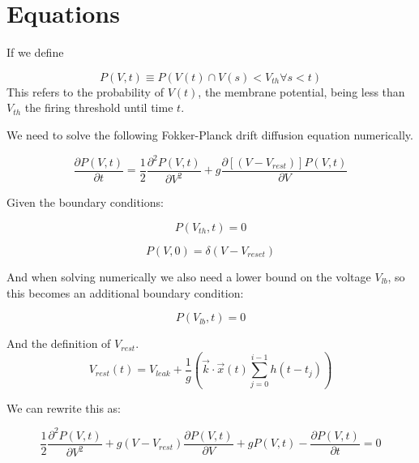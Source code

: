 \documentclass[10pt]{article}
\begin{document}
 

\section{Equations}


If we define

\begin{equation}
    P(V,t) \equiv P(V(t) \cap  V(s) < V_{th} \forall s < t)
\end{equation}
This refers to the probability of $V(t)$, the membrane potential,
being less than $V_{th}$ the firing threshold until time $t$.  


We need to solve the following Fokker-Planck drift diffusion equation
numerically.

\begin{equation}
    \frac{\partial P(V,t)}{\partial t} =
    \frac{1}{2} \frac{\partial^2 P(V,t) } {\partial V^2} +
    g\frac{\partial[(V-V_{rest})]P(V,t)}{\partial V}
\end{equation}

Given the boundary conditions:
 
\begin{equation}
    P(V_{th},t) = 0
\end{equation}

\begin{equation}
    P(V,0) = \delta(V-V_{reset})
\end{equation}

And when solving numerically we also need a lower bound on the
voltage $V_{lb}$, so this becomes an additional boundary condition:

\begin{equation}
    P(V_{lb},t) = 0 
\end{equation}


And the definition of $V_{rest}$.
\begin{equation}
    V_{rest}(t) = V_{leak} + \frac{1}{g}(\vec{k} \cdot \vec{x}(t)
    \sum_{j=0}^{i-1}h(t-t_j))
\end{equation}


We can rewrite this as:

\begin{equation}
    \frac{1}{2} \frac{\partial^2 P(V,t) } {\partial V^2} +
    g(V-V_{rest})\frac{\partial P(V,t)}{\partial V} +
    gP(V,t) -
    \frac{\partial P(V,t)}{\partial t} = 
    0
\end{equation}
\end{document}
